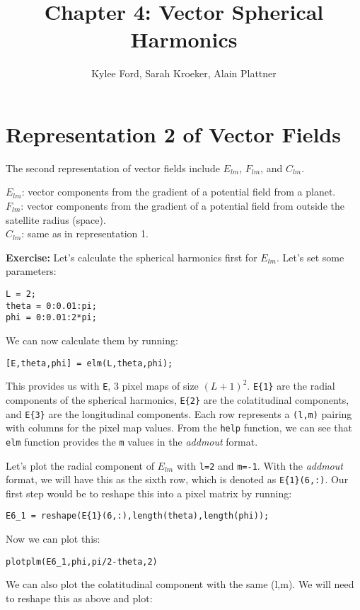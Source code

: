 \documentclass[11pt]{article}
\title{Chapter 4: Vector Spherical Harmonics}
\author{Kylee Ford, Sarah Kroeker, Alain Plattner}
\begin{document}
\maketitle

\section{Representation 2 of Vector Fields}

The second representation of vector fields include $E_{lm}$, $F_{lm}$, and $C_{lm}$.

$E_{lm}$: vector components from the gradient of a potential field from a planet. \\
$F_{lm}$: vector components from the gradient of a potential field from outside the satellite radius (space). \\
$C_{lm}$: same as in representation 1.

\textbf{Exercise:} Let's calculate the spherical harmonics first for $E_{lm}$.  Let's set some parameters:

\verb|L = 2;|\\
\verb|theta = 0:0.01:pi;|\\
\verb|phi = 0:0.01:2*pi;|

We can now calculate them by running:

\verb|[E,theta,phi] = elm(L,theta,phi);|

This provides us with \verb|E|, 3 pixel maps of size $(L+1)^2$.  \verb|E{1}| are the radial components of the spherical harmonics, \verb|E{2}| are the colatitudinal components, and \verb|E{3}| are the longitudinal components.  Each row represents a \verb|(l,m)| pairing with columns for the pixel map values.  From the \verb|help| function, we can see that \verb|elm| function provides the \verb|m| values in the \textit{addmout} format.  

Let's plot the radial component of $E_{lm}$ with \verb|l=2| and \verb|m=-1|.  With the \textit{addmout} format, we will have this as the sixth row, which is denoted as \verb|E{1}(6,:)|.  Our first step would be to reshape this into a pixel matrix by running:

\verb|E6_1 = reshape(E{1}(6,:),length(theta),length(phi));|

Now we can plot this:

\verb|plotplm(E6_1,phi,pi/2-theta,2)|

We can also plot the colatitudinal component with the same (l,m).  We will need to reshape this as above and plot:
\end{document}
